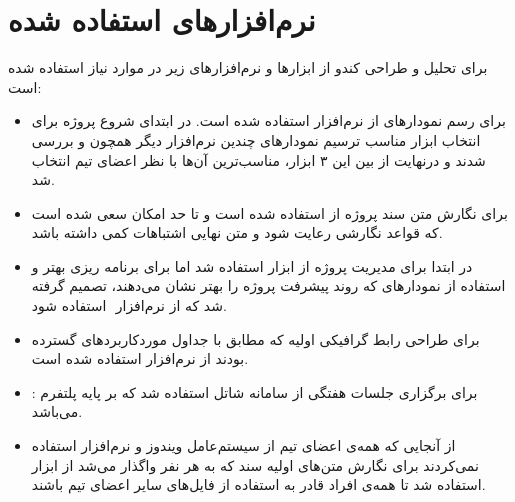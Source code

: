\documentclass{report}
\begin{document}
\section{نرم‌افزارهای استفاده شده}
برای تحلیل و طراحی کندو از ابزارها و نرم‌افزارهای زیر در موارد نیاز استفاده شده است:
\begin{itemize}
\item
{}
برای رسم نمودارهای
از نرم‌افزار
استفاده شده است. در ابتدای شروع پروژه برای انتخاب ابزار مناسب ترسیم نمودارهای
چندین نرم‌افزار دیگر همچون
و 
بررسی شدند و درنهایت از بین این ۳ ابزار، مناسب‌ترین آن‌ها با نظر اعضای تیم انتخاب شد.

\item
{}
برای نگارش متن سند پروژه از
استفاده شده است و تا حد امکان سعی شده است که قواعد نگارشی رعایت شود و متن نهایی اشتباهات کمی داشته باشد.
\item
{}
در ابتدا برای مدیریت پروژه از ابزار
استفاده شد اما برای برنامه ریزی بهتر و استفاده از نمودارهای
که روند پیشرفت پروژه را بهتر نشان می‌دهند، تصمیم گرفته شد که از نرم‌افزار
‌
استفاده شود.
\item
{}
برای طراحی رابط گرافیکی اولیه که مطابق با جداول موردکاربردهای گسترده بودند از نرم‌افزار
استفاده شده است.
\item
{}
:
برای برگزاری جلسات هفتگی از سامانه شاتل استفاده شد که بر پایه پلتفرم
می‌باشد.
\item
{}
از آنجایی که همه‌ی اعضای تیم از سیستم‌عامل ویندوز و نرم‌افزار
استفاده نمی‌کردند برای نگارش متن‌های اولیه سند که به هر نفر واگذار می‌شد از ابزار
استفاده شد تا همه‌ی افراد قادر به استفاده از فایل‌های سایر اعضای تیم باشند.
\end{itemize}
\end{document}
